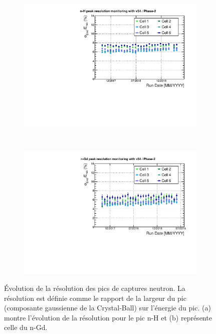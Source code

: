 {\begin{figure}[h!]
\begin{subfigure}[b]{0.49\textwidth}
\centering
\includegraphics[width=1\textwidth]{images/Sigma_peak_Erec34_nH_250GC_phase-2_fit-crystalball_stacks-20_analysis.pdf}
\caption{}
\label{fig:Sigma_peak_Erec34_nH_250GC_phase-2_fit-crystalball_stacks-20_analysis.pdf}
\end{subfigure}
~ %
\begin{subfigure}[b]{0.49\textwidth}
\centering
\includegraphics[width=1\textwidth]{images/Sigma_peak_Erec34_nGd_phase-2_fit-crystalball_stacks-20_analysis.pdf}
\caption{}
\label{fig:Sigma_peak_Erec34_nGd_phase-2_fit-crystalball_stacks-20_analysis.pdf}
\end{subfigure}


\caption[Évolution de la résolution des pics de captures neutron]{Évolution de la résolution des pics de captures neutron. La résolution est définie comme le rapport de la largeur du pic (composante gaussienne de la Crystal-Ball) sur l'énergie du pic. (a) montre l'évolution de la résolution pour le pic n-H et (b) représente celle du n-Gd.}
\label{fig:nX_resolution_evol}

\end{figure}

}

